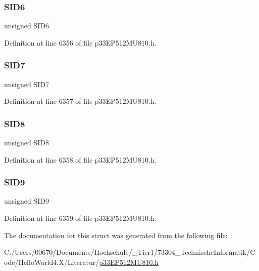 \subsubsection{\texorpdfstring{S\+I\+D6}{SID6}}
{\footnotesize\ttfamily unsigned S\+I\+D6}



Definition at line 6356 of file p33\+E\+P512\+M\+U810.\+h.

\mbox{\label{structtag_c2_r_x_f3_s_i_d_b_i_t_s_a34097fb76decd431701fa2d86a22328e}} 
\subsubsection{\texorpdfstring{S\+I\+D7}{SID7}}
{\footnotesize\ttfamily unsigned S\+I\+D7}



Definition at line 6357 of file p33\+E\+P512\+M\+U810.\+h.

\mbox{\label{structtag_c2_r_x_f3_s_i_d_b_i_t_s_afe74894633244fdb0b0c01b4e8c522e7}} 
\subsubsection{\texorpdfstring{S\+I\+D8}{SID8}}
{\footnotesize\ttfamily unsigned S\+I\+D8}



Definition at line 6358 of file p33\+E\+P512\+M\+U810.\+h.

\mbox{\label{structtag_c2_r_x_f3_s_i_d_b_i_t_s_a33587704948067005c2a6a3ccc503c99}} 
\subsubsection{\texorpdfstring{S\+I\+D9}{SID9}}
{\footnotesize\ttfamily unsigned S\+I\+D9}



Definition at line 6359 of file p33\+E\+P512\+M\+U810.\+h.



The documentation for this struct was generated from the following file\+:\begin{DoxyCompactItemize}
\item 
C\+:/\+Users/00670/\+Documents/\+Hochschule/\+\_\+\+Tier1/73304\+\_\+\+Technische\+Informatik/\+Code/\+Hello\+World4.\+X/\+Literatur/\hyperlink{p33_e_p512_m_u810_8h}{p33\+E\+P512\+M\+U810.\+h}\end{DoxyCompactItemize}
